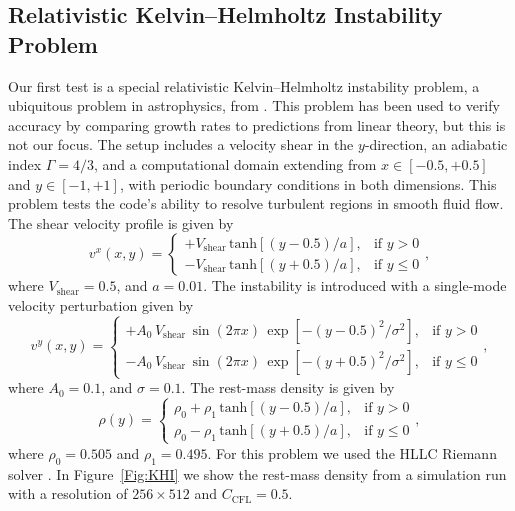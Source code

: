 \documentclass[letterpaper]{jpconf}
\newcommand{\figref}[1]{Figure~\ref{#1}}
\begin{document}
\subsection{Relativistic Kelvin--Helmholtz Instability Problem}
Our first test is a special relativistic Kelvin--Helmholtz instability problem, a ubiquitous problem in astrophysics, from \cite{RadiceRezzolla2012}. This problem has been used to verify accuracy by comparing growth rates to predictions from linear theory, but this is not our focus. The setup includes a velocity shear in the $y$-direction, an adiabatic index $\Gamma=4/3$, and a computational domain extending from $x\in\left[-0.5,+0.5\right]$ and $y\in\left[-1,+1\right]$, with periodic boundary conditions in both dimensions. This problem tests the code's ability to resolve turbulent regions in smooth fluid flow. The shear velocity profile is given by
\begin{equation}
v^{x}\left(x,y\right)=\begin{cases}+V_{\text{shear}}\,\text{tanh}\left[\left(y-0.5\right)/a\right],&\text{if }y>0\\-V_{\text{shear}}\,\text{tanh}\left[\left(y+0.5\right)/a\right],&\text{if }y\leq0\end{cases},
\end{equation}
where $V_{\text{shear}}=0.5$, and $a=0.01$.
The instability is introduced with a single-mode velocity perturbation given by
\begin{equation}
v^{y}\left(x,y\right)=\begin{cases}+A_{0}\,V_{\text{shear}}\,\sin\left(2\pi x\right)\,\exp\left[-\left(y-0.5\right)^{2}/\sigma^{2}\right],&\text{if }y>0\\-A_{0}\,V_{\text{shear}}\,\sin\left(2\pi x\right)\,\exp\left[-\left(y+0.5\right)^{2}/\sigma^{2}\right],&\text{if }y\leq0\end{cases},
\end{equation}
where $A_{0}=0.1$, and $\sigma=0.1$. The rest-mass density is given by
\begin{equation}
\rho\left(y\right)=\begin{cases}\rho_{0}+\rho_{1}\,\text{tanh}\left[\left(y-0.5\right)/a\right],&\text{if }y>0\\\rho_{0}-\rho_{1}\,\text{tanh}\left[\left(y+0.5\right)/a\right],&\text{if }y\leq0\end{cases},
\end{equation}
where $\rho_{0}=0.505$ and $\rho_{1}=0.495$. For this problem we used the HLLC Riemann solver \cite{MignoneBodo2005}. In \figref{Fig:KHI} we show the rest-mass density from a simulation run with a resolution of $256\times512$ and $C_{\text{CFL}}=0.5$.
\end{document}
